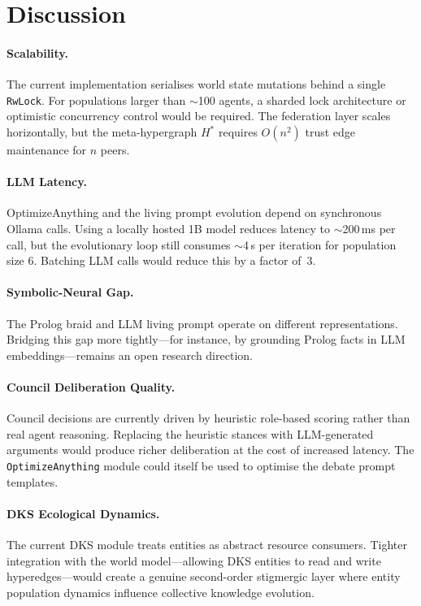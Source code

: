 \documentclass[11pt]{article}
\begin{document}
\section{Discussion}
\label{sec:discussion}

\paragraph{Scalability.}
The current implementation serialises world state mutations behind a single
\texttt{RwLock}. For populations larger than $\sim$100 agents, a sharded
lock architecture or optimistic concurrency control would be required. The
federation layer scales horizontally, but the meta-hypergraph $H^*$ requires
$O(n^2)$ trust edge maintenance for $n$ peers.

\paragraph{LLM Latency.}
OptimizeAnything and the living prompt evolution depend on synchronous Ollama
calls. Using a locally hosted 1B model reduces latency to $\sim$200\,ms per
call, but the evolutionary loop still consumes $\sim$4\,s per iteration for
population size 6. Batching LLM calls would reduce this by a factor of~3.

\paragraph{Symbolic-Neural Gap.}
The Prolog braid and LLM living prompt operate on different representations.
Bridging this gap more tightly---for instance, by grounding Prolog facts in
LLM embeddings---remains an open research direction.

\paragraph{Council Deliberation Quality.}
Council decisions are currently driven by heuristic role-based scoring rather
than real agent reasoning. Replacing the heuristic stances with LLM-generated
arguments would produce richer deliberation at the cost of increased latency.
The \texttt{OptimizeAnything} module could itself be used to optimise the
debate prompt templates.

\paragraph{DKS Ecological Dynamics.}
The current DKS module treats entities as abstract resource consumers. Tighter
integration with the world model---allowing DKS entities to read and write
hyperedges---would create a genuine second-order stigmergic layer where
entity population dynamics influence collective knowledge evolution.
\end{document}
